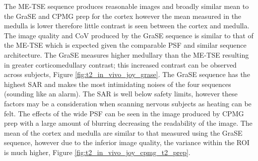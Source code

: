 The \ac{ME-TSE} sequence produces reasonable images and broadly similar mean \ttwo to the \ac{GraSE} and \ac{CPMG} \ttwo prep for the cortex however the mean \ttwo measured in the medulla is lower therefore little contrast is seen between the cortex and medulla.  The image quality  and \ac{CoV} produced by the \ac{GraSE} sequence is similar to that of the \ac{ME-TSE} which is expected given the comparable \ac{PSF} and similar sequence architecture. The \ac{GraSE} measures higher medullary \ttwo than the \ac{ME-TSE} resulting in greater corticomedullary contrast; this increased contrast can be observed across subjects, Figure \ref{fig:t2_in_vivo_joy_grase}. The \ac{GraSE} sequence has the highest \ac{SAR} and makes the most intimidating noises of the four sequences (sounding like an alarm). The \ac{SAR} is well below safety limits, however these factors may be a consideration when scanning nervous subjects as heating can be felt. The effects of the wide \ac{PSF} can be seen in the image produced by \ac{CPMG} \ttwo prep with a large amount of blurring decreasing the readability of the image. The mean \ttwo of the cortex and medulla are similar to that measured using the \ac{GraSE} sequence, however due to the inferior image quality, the variance within the \ac{ROI} is much higher, Figure \ref{fig:t2_in_vivo_joy_cpmg_t2_prep}.

